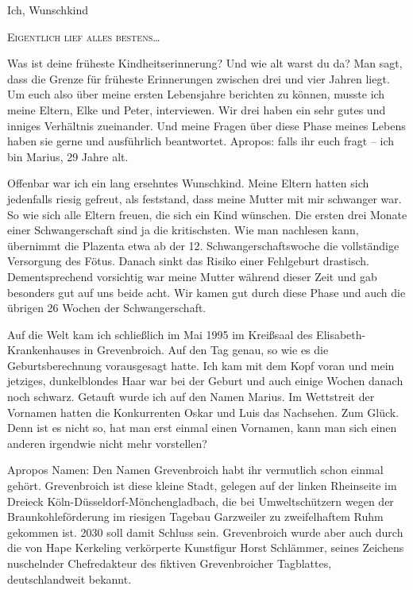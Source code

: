 \documentclass[fontsize=14pt,a4paper,headinclude,DIV=calc,automark]{scrbook}
\begin{document}
\pagestyle{scrheadings}

\thispagestyle{scrheadings} %

\leavevmode
{\noindent\fontsize{18}{24}\selectfont\textcolor{myblue}{Ich, Wunschkind}\par}
{\noindent\fontsize{14}{20}\selectfont\scshape\textcolor{myblue}{Eigentlich lief alles bestens}\ldots\par}
\vspace*{0.5\baselineskip}
\normalsize

\noindent Was ist deine früheste Kindheitserinnerung? Und wie alt warst du da? Man sagt, dass die Grenze für früheste Erinnerungen zwischen drei und vier Jahren liegt. Um euch also über meine ersten Lebensjahre berichten zu können, musste ich meine Eltern, Elke und Peter, interviewen. Wir drei haben ein sehr gutes und inniges Verhältnis zueinander. Und meine Fragen über diese Phase meines Lebens haben sie gerne und ausführlich beantwortet. Apropos: falls ihr euch fragt – ich bin Marius, 29 Jahre alt.

Offenbar war ich ein lang ersehntes Wunschkind. Meine Eltern hatten sich jedenfalls riesig gefreut, als feststand, dass meine Mutter mit mir schwanger war. So wie sich alle Eltern freuen, die sich ein Kind wünschen. Die ersten drei Monate einer Schwangerschaft sind ja die kritischsten. Wie man nachlesen kann, übernimmt die Plazenta etwa ab der 12. Schwangerschaftswoche die vollständige Versorgung des Fötus. Danach sinkt das Risiko einer Fehlgeburt drastisch. Dementsprechend vorsichtig war meine Mutter während dieser Zeit und gab besonders gut auf uns beide acht. Wir kamen gut durch diese Phase und auch die übrigen 26 Wochen der Schwangerschaft.

Auf die Welt kam ich schließlich im Mai 1995 im Kreißsaal des Elisabeth-Kran\-ken\-hau\-ses in Grevenbroich. Auf den Tag genau, so wie es die Geburtsberechnung vorausgesagt hatte. Ich kam mit dem Kopf voran und mein jetziges, dunkelblondes Haar war bei der Geburt und auch einige Wochen danach noch schwarz. Getauft wurde ich auf den Namen Marius. Im Wettstreit der Vornamen hatten die Konkurrenten Oskar und Luis das Nachsehen. Zum Glück. Denn ist es nicht so, hat man erst einmal einen Vornamen, kann man sich einen anderen irgendwie nicht mehr vorstellen?

Apropos Namen: Den Namen Grevenbroich habt ihr vermutlich schon einmal gehört. Grevenbroich ist diese kleine Stadt, gelegen auf der linken Rheinseite im Dreieck Köln-Düsseldorf-Mönchengladbach, die bei Umweltschützern wegen der Braunkohleförderung im riesigen Tagebau Garzweiler zu zweifelhaftem Ruhm gekommen ist. 2030 soll damit Schluss sein. Grevenbroich wurde aber auch durch die von Hape Kerkeling verkörperte Kunstfigur Horst Schlämmer, seines Zeichens nuschelnder Chefredakteur des fiktiven Grevenbroicher Tagblattes, deutschlandweit bekannt.
\end{document}
